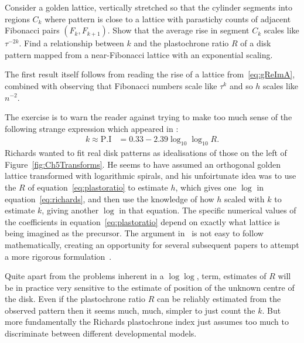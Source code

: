 \begin{jExercise}
 Consider a golden lattice, vertically stretched so that the cylinder segments into regions $C_k$ where pattern is close to a lattice with parastichy counts of adjacent Fibonacci pairs $(F_k,F_{k+1})$.
	Show that the average rise in segment $C_k$ scales like $\tau^{-2k}$.
	Find a relationship between $k$ and the plastochrone ratio $R$ of a disk pattern mapped from a near-Fibonacci lattice with an exponential scaling.
\end{jExercise}
\begin{jAnswer}
	The first result itself follows
	from reading the rise of a lattice from~\eqref{eq:gReImA}, combined with observing that Fibonacci numbers scale like $\tau^k$
	and so $h$ scales like $n^{-2}$. 
	
The exercise is to warn the reader against trying to make too much sense of the following strange expression which appeared in
	\autocite{richardsPhyllotaxisItsQuantitative1951}:
	\begin{align}
		k\approx \mbox{P.I} &= 0.33 - 2.39 \log_{10}  \log_{10} R.
		\label{eq:richards}
	\end{align}
	 Richards wanted to fit real disk patterns as idealisations of those on the left of Figure~\ref{fig:Ch5Transforms}. He  
	 seems to have assumed an orthogonal golden lattice transformed with logarithmic spirals, and his unfoirtunate idea was to use the $R$ of equation~\eqref{eq:plastoratio} to estimate $h$, which gives one $\log$ in equation~\ref{eq:richards}, and then use the knowledge of how $h$ scaled with $k$ to estimate $k$, giving another $\log$ in that equation. The specific numerical values of the coefficients in equation~\eqref{eq:plastoratio} depend on exactly what lattice is being imagined as the precursor. The argument in~	\autocite{richardsPhyllotaxisItsQuantitative1951} is not easy to follow mathematically, creating an opportunity for several subsequent papers to attempt a more rigorous formulation~\autocite{thornleyPhyllotaxisIIDescription1975,jeanBib647,jeanBib278}.

Quite apart from the problems inherent in a $\log \log$, term, estimates of $R$ will be in practice very sensitive  to the estimate of position of the unknown centre of the disk. Even if the plastochrone ratio $R$ can be reliably estimated from the observed pattern then it seems much, much,  simpler to just count the $k$. But more fundamentally the Richards plastochrone index just assumes too much to discriminate between different developmental models.  

\end{jAnswer}
\clearpage

